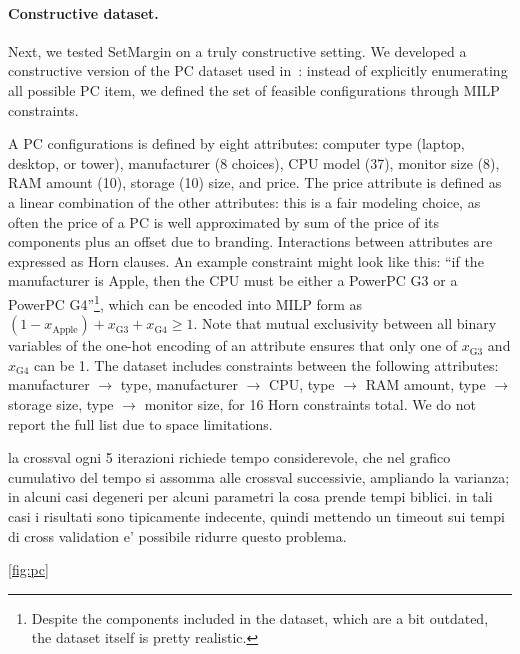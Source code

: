 \documentclass{article}
\renewcommand\[{\begin{equation}}
\renewcommand\]{\end{equation}}
\begin{document}
\paragraph{Constructive dataset.} Next, we tested {\sc SetMargin} on a truly
constructive setting. We developed a constructive version of the PC dataset
used in~\cite{guo2010real}: instead of explicitly enumerating all possible PC
item, we defined the set of feasible configurations through MILP constraints.

A PC configurations is defined by eight attributes: computer type (laptop,
desktop, or tower), manufacturer (8 choices), CPU model (37), monitor size (8), RAM amount (10), storage (10)
size, and price.
The price attribute is defined as a linear combination of the other
attributes: this is a fair modeling choice, as often the price of a PC is
well approximated by sum of the price of its components plus an offset due to
branding.
%
Interactions between attributes are expressed as Horn clauses. An example
constraint might look like this: ``if the manufacturer is Apple, then the
CPU must be either a PowerPC G3 or a PowerPC G4''\footnote{Despite the components
included in the dataset, which are a bit outdated, the dataset itself is pretty
realistic.}, which can be encoded
into MILP form as
%
$ (1 - x_\text{Apple}) + x_\text{G3} + x_\text{G4} \ge 1 $.
%
Note that mutual exclusivity between all binary variables of the
one-hot encoding of an attribute ensures that only one of
$x_\text{G3}$ and $x_\text{G4}$ can be 1.  The dataset includes
constraints between the following attributes: manufacturer $\to$ type,
manufacturer $\to$ CPU, type $\to$ RAM amount, type $\to$ storage
size, type $\to$ monitor size, for 16 Horn constraints total. We
do not report the full list due to space limitations.


la crossval ogni 5 iterazioni richiede tempo considerevole, che nel
grafico cumulativo del tempo si assomma alle crossval successivie, ampliando
la varianza; in alcuni casi degeneri per alcuni parametri la cosa prende
tempi biblici. in tali casi i risultati sono tipicamente indecente, quindi mettendo
un timeout sui tempi di cross validation e' possibile ridurre questo problema.

\ref{fig:pc}
\end{document}
